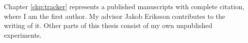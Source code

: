\authorcontributions



Chapter \ref{chp:tracker} represents a published manuscripts with complete citation, where I am the first author.
My advisor Jakob Eriksson contributes to the writing of it.
Other parts of this thesis consist of my own unpublished experiments.